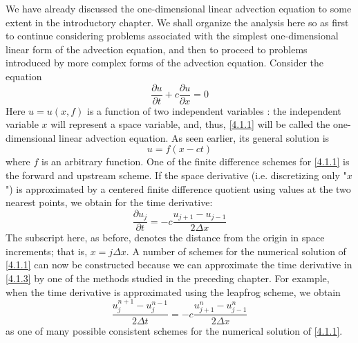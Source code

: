 We have already discussed the one-dimensional linear advection equation to some extent in the introductory chapter. We shall organize the analysis here so as first to continue considering problems associated with the simplest one-dimensional linear form of the advection equation, and then to proceed to problems introduced by more complex forms of the advection equation.
Consider the equation
\begin{equation}\label{4.1.1}
    \frac{\partial u}{\partial t}+c\frac{\partial u}{\partial x}=0
\end{equation}
Here $u=u(x,f)$ is a function of two independent variables : the independent variable $x$ will represent a space variable, and, thus, \ref{4.1.1} will be called the one-dimensional linear advection equation. As seen earlier, its general solution is
$$u=f(x-ct)$$ where $f$ is an arbitrary function.
One of the finite difference schemes for \ref{4.1.1} is the forward and upstream scheme. If the space derivative (i.e. discretizing only "$x$") is approximated by a centered finite difference quotient using values at the two nearest points, we obtain for the time derivative:
\begin{equation}\label{4.1.3}
    \frac{\partial u_j}{\partial t}=-c\frac{u_{j+1}-u_{j-1}}{2\Delta x}
\end{equation}
The subscript here, as before, denotes the distance from the origin in space increments; that is, $x=j\Delta x$. A number of schemes for the numerical solution of \ref{4.1.1} can now be constructed because we can approximate the time derivative in \ref{4.1.3} by one of the methods studied in the preceding chapter. For example, when the time derivative is approximated using the leapfrog scheme, we obtain
\begin{equation}\label{4.1.4}
    \frac{u^{n+1}_j-u^{n-1}_j}{2\Delta t}=-c\frac{u_{j+1}^n-u_{j-1}^n}{2\Delta x}
\end{equation}
as one of many possible consistent schemes for the numerical solution of \ref{4.1.1}.


